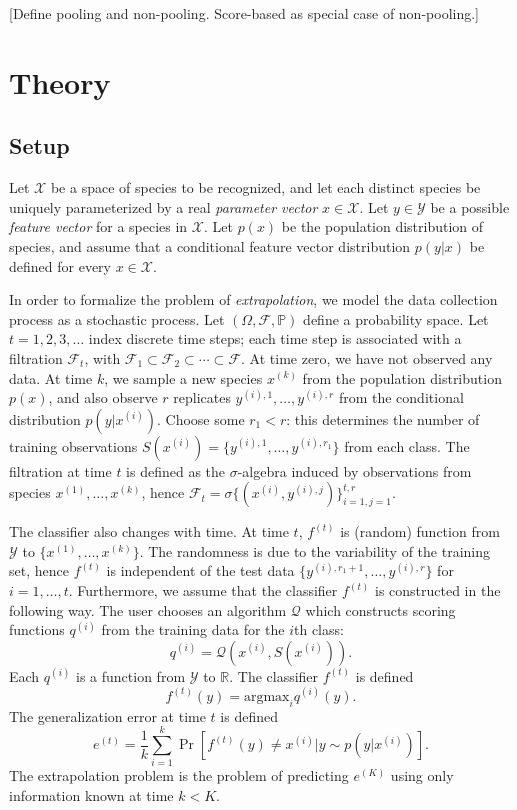 \documentclass{article}
\newcommand{\argmax}{\text{argmax}}
\begin{document}
[Define pooling and non-pooling.  Score-based as special case of non-pooling.]

\section{Theory}

\subsection{Setup}

Let $\mathcal{X}$ be a space of species to be recognized, and let each
distinct species be uniquely parameterized by a real \emph{parameter
  vector} $x \in \mathcal{X}$.  Let $y \in \mathcal{Y}$ be a possible
\emph{feature vector} for a species in $\mathcal{X}$.  Let $p(x)$ be
the population distribution of species, and assume that a conditional
feature vector distribution $p(y|x)$ be defined for every $x \in
\mathcal{X}$.

In order to formalize the problem of \emph{extrapolation}, we model
the data collection process as a stochastic process.  Let $(\Omega,
\mathcal{F}, \mathbb{P})$ define a probability space.  Let $t = 1, 2,
3, \hdots $ index discrete time steps; each time step is associated
with a filtration $\mathcal{F}_t$, with $\mathcal{F}_1 \subset
\mathcal{F}_2 \subset \cdots \subset \mathcal{F}$.  At time zero, we
have not observed any data.  At time $k$, we sample a new species
$x^{(k)}$ from the population distribution $p(x)$, and also observe
$r$ replicates $y^{(i), 1}, \hdots, y^{(i), r}$ from the conditional
distribution $p(y|x^{(i)})$.  Choose some $r_1 < r$: this determines
the number of training observations $S(x^{(i)}) = \{y^{(i), 1},\hdots,
y^{(i), r_1}\}$ from each class.  The filtration at time $t$ is
defined as the $\sigma$-algebra induced by observations from species
$x^{(1)}, \hdots, x^{(k)}$, hence $\mathcal{F}_t = \sigma\{(x^{(i)},
y^{(i), j})\}_{i=1, j=1}^{t, r}$.

The classifier also changes with time.  At time $t$, $f^{(t)}$ is
(random) function from $\mathcal{Y}$ to $\{x^{(1)}, \hdots,
x^{(k)}\}$.  The randomness is due to the variability of the training
set, hence $f^{(t)}$ is independent of the test data $\{y^{(i), r_1 +
  1}, \hdots, y^{(i), r}\}$ for $i = 1,\hdots, t$.  Furthermore, we
assume that the classifier $f^{(t)}$ is constructed in the following
way.  The user chooses an algorithm $\mathcal{Q}$ which constructs
scoring functions $q^{(i)}$ from the training data for the $i$th
class:
\[
q^{(i)} = \mathcal{Q}(x^{(i)}, S(x^{(i)})).
\]
Each $q^{(i)}$ is a function from $\mathcal{Y}$ to $\mathbb{R}$.  The
classifier $f^{(t)}$ is defined
\[
f^{(t)}(y) = \argmax_i q^{(i)}(y).
\]
The generalization error at time $t$ is defined
\[
e^{(t)} = \frac{1}{k}\sum_{i=1}^k \Pr[f^{(t)}(y) \neq x^{(i)}|y \sim p(y|x^{(i)})].
\]
The extrapolation problem is the problem of predicting $e^{(K)}$ using
only information known at time $k < K$.
\end{document}
